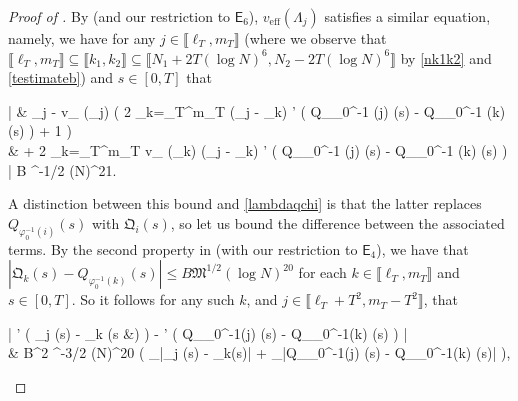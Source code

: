 \documentclass{amsart}
\numberwithin{equation}{section}
\DeclareMathOperator{\eff}{eff}
\theoremstyle{remark}
\theoremstyle{definition}
\begin{document}
\begin{proof}[Proof of ]
		By  (and our restriction to $\mathsf{E}_6$), $v_{\eff} (\Lambda_j)$ satisfies a similar equation, namely, we have for any $j \in \llbracket \ell_T, m_T \rrbracket$ (where we observe that $\llbracket \ell_T, m_T \rrbracket \subseteq \llbracket k_1, k_2 \rrbracket \subseteq \llbracket N_1 + 2T(\log N)^6, N_2 - 2T(\log N)^6 \rrbracket$ by \eqref{nk1k2} and \eqref{testimateb}) and $s \in [0, T]$ that
		\begin{flalign}
			\label{lambdavchi} 
			\begin{aligned} 
			\Bigg| & \Lambda_j - v_{\eff} (\Lambda_j) \cdot \Bigg( 2 \displaystyle\sum_{k=\ell_T}^{m_T}  (\Lambda_j - \Lambda_k) \cdot \chi' \big( Q_{\varphi_0^{-1} (j)} (s) - Q_{\varphi_0^{-1} (k)} (s) \big) + 1 \Bigg) \\
			& \qquad \quad + 2 \displaystyle\sum_{k=\ell_T}^{m_T} v_{\eff} (\Lambda_k) \cdot {} (\Lambda_j - \Lambda_k) \cdot \chi' \big( Q_{\varphi_0^{-1} (j)} (s) - Q_{\varphi_0^{-1} (k)} (s) \big) \Bigg| \le B ^{-1/2} (\log N)^{21}.
			\end{aligned} 
		\end{flalign}
		
		\noindent A distinction between this bound and \eqref{lambdaqchi} is that the latter replaces $Q_{\varphi_0^{-1} (i)} (s)$ with $\mathfrak{Q}_i (s)$, so let us bound the difference between the associated terms. By the second property in  (with our restriction to $\mathsf{E}_4$), we have that $|\mathfrak{Q}_k(s) - Q_{\varphi_0^{-1}(k)}(s)| \le B \mathfrak{M}^{1/2} (\log N)^{20}$ for each $k \in \llbracket \ell_T, m_T \rrbracket$ and $s \in [0, T]$. So it follows for any such $k$, and $j \in \llbracket \ell_T + T^2, m_T - T^2 \rrbracket$, that  
		\begin{flalign}
			\label{chiq2} 
			\begin{aligned}
				\big| \chi' \big( \mathfrak{Q}_j (s) - _k (s &) \big) - \chi' \big( Q_{\varphi_0^{-1}(j)} (s) - Q_{\varphi_0^{-1}(k)} (s) \big) \big| \\
				& \le B^2 ^{-3/2} (\log N)^{20} \cdot \big( _{|\mathfrak{Q}_j (s) - _k(s)| \le {}} +  _{|Q_{\varphi_0^{-1}(j)} (s) - Q_{\varphi_0^{-1}(k)} (s)| \le \mathfrak{M}} \big),
			\end{aligned} 
		\end{flalign}
		

\end{proof}
\end{document}
